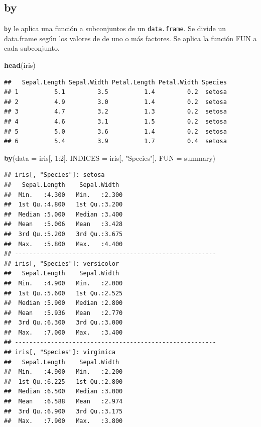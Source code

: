 \documentclass[]{article}
\newenvironment{Shaded}{\begin{snugshade}}{\end{snugshade}}
\newcommand{\KeywordTok}[1]{\textcolor[rgb]{0.13,0.29,0.53}{\textbf{{#1}}}}
\newcommand{\DataTypeTok}[1]{\textcolor[rgb]{0.13,0.29,0.53}{{#1}}}
\newcommand{\DecValTok}[1]{\textcolor[rgb]{0.00,0.00,0.81}{{#1}}}
\newcommand{\StringTok}[1]{\textcolor[rgb]{0.31,0.60,0.02}{{#1}}}
\newcommand{\NormalTok}[1]{{#1}}
\begin{document}
\subsection{by}\label{by}

\texttt{by} le aplica una función a subconjuntos de un
\texttt{data.frame}. Se divide un data.frame según los valores de de uno
o más factores. Se aplica la función FUN a cada subconjunto.

\begin{Shaded}
\begin{Highlighting}[]
\KeywordTok{head}\NormalTok{(iris)}
\end{Highlighting}
\end{Shaded}

\begin{verbatim}
##   Sepal.Length Sepal.Width Petal.Length Petal.Width Species
## 1          5.1         3.5          1.4         0.2  setosa
## 2          4.9         3.0          1.4         0.2  setosa
## 3          4.7         3.2          1.3         0.2  setosa
## 4          4.6         3.1          1.5         0.2  setosa
## 5          5.0         3.6          1.4         0.2  setosa
## 6          5.4         3.9          1.7         0.4  setosa
\end{verbatim}

\begin{Shaded}
\begin{Highlighting}[]
\KeywordTok{by}\NormalTok{(}\DataTypeTok{data =} \NormalTok{iris[, }\DecValTok{1}\NormalTok{:}\DecValTok{2}\NormalTok{], }\DataTypeTok{INDICES =} \NormalTok{iris[, }\StringTok{"Species"}\NormalTok{], }\DataTypeTok{FUN =} \NormalTok{summary)}
\end{Highlighting}
\end{Shaded}

\begin{verbatim}
## iris[, "Species"]: setosa
##   Sepal.Length    Sepal.Width   
##  Min.   :4.300   Min.   :2.300  
##  1st Qu.:4.800   1st Qu.:3.200  
##  Median :5.000   Median :3.400  
##  Mean   :5.006   Mean   :3.428  
##  3rd Qu.:5.200   3rd Qu.:3.675  
##  Max.   :5.800   Max.   :4.400  
## -------------------------------------------------------- 
## iris[, "Species"]: versicolor
##   Sepal.Length    Sepal.Width   
##  Min.   :4.900   Min.   :2.000  
##  1st Qu.:5.600   1st Qu.:2.525  
##  Median :5.900   Median :2.800  
##  Mean   :5.936   Mean   :2.770  
##  3rd Qu.:6.300   3rd Qu.:3.000  
##  Max.   :7.000   Max.   :3.400  
## -------------------------------------------------------- 
## iris[, "Species"]: virginica
##   Sepal.Length    Sepal.Width   
##  Min.   :4.900   Min.   :2.200  
##  1st Qu.:6.225   1st Qu.:2.800  
##  Median :6.500   Median :3.000  
##  Mean   :6.588   Mean   :2.974  
##  3rd Qu.:6.900   3rd Qu.:3.175  
##  Max.   :7.900   Max.   :3.800
\end{verbatim}
\end{document}
